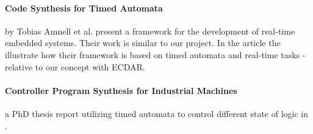 \paragraph{Code Synthesis for Timed Automata}
by Tobias Amnell et al. present a framework for the development of real-time
embedded systems\cite{Amnell:2002:CST:779110.779112}. Their work is similar to
our project. In the article the illustrate how their framework is based on timed
automata and real-time tasks - relative to our concept with ECDAR.

\paragraph{Controller Program Synthesis for Industrial Machines} a PhD thesis report utilizing timed automata to control different state of logic in \cite{controller-program-synthesis:2005}.
